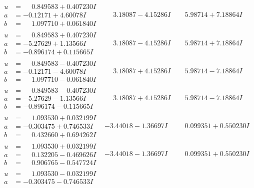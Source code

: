 \documentclass[1p]{elsarticle_modified}
\theoremstyle{definition}
\begin{document}
$$\begin{array}{c|c|c}
\begin{aligned}
u &= \phantom{-}0.849583 + 0.407230 I \\
a &= -0.12171 + 4.60078 I \\
b &= \phantom{-}1.097710 + 0.061840 I\end{aligned}
 & \phantom{-}3.18087 - 4.15286 I & \phantom{-}5.98714 + 7.18864 I \\ \hline\begin{aligned}
u &= \phantom{-}0.849583 + 0.407230 I \\
a &= -5.27629 + 1.13566 I \\
b &= -0.896174 + 0.115665 I\end{aligned}
 & \phantom{-}3.18087 - 4.15286 I & \phantom{-}5.98714 + 7.18864 I \\ \hline\begin{aligned}
u &= \phantom{-}0.849583 - 0.407230 I \\
a &= -0.12171 - 4.60078 I \\
b &= \phantom{-}1.097710 - 0.061840 I\end{aligned}
 & \phantom{-}3.18087 + 4.15286 I & \phantom{-}5.98714 - 7.18864 I \\ \hline\begin{aligned}
u &= \phantom{-}0.849583 - 0.407230 I \\
a &= -5.27629 - 1.13566 I \\
b &= -0.896174 - 0.115665 I\end{aligned}
 & \phantom{-}3.18087 + 4.15286 I & \phantom{-}5.98714 - 7.18864 I \\ \hline\begin{aligned}
u &= \phantom{-}1.093530 + 0.032199 I \\
a &= -0.303475 + 0.746533 I \\
b &= \phantom{-}0.432660 + 0.694262 I\end{aligned}
 & -3.44018 - 1.36697 I & \phantom{-}0.099351 + 0.550230 I \\ \hline\begin{aligned}
u &= \phantom{-}1.093530 + 0.032199 I \\
a &= \phantom{-}0.132205 - 0.469626 I \\
b &= \phantom{-}0.906765 - 0.547724 I\end{aligned}
 & -3.44018 - 1.36697 I & \phantom{-}0.099351 + 0.550230 I \\ \hline\begin{aligned}
u &= \phantom{-}1.093530 - 0.032199 I \\
a &= -0.303475 - 0.746533 I \\

\end{aligned}
\end{array}$$
\end{document}
